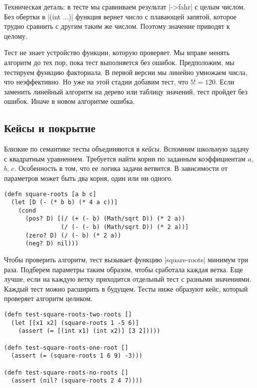 Техническая деталь: в тесте мы сравниваем результат \spverb|->fahr| с целым
числом. Без обертки в \spverb|(int ...)| функция вернет число с плавающей
запятой, которое трудно сравнить с другим таким же числом. Поэтому значение
приводят к целому.

Тест не знает устройство функции, которую проверяет. Мы вправе менять алгоритм
до тех пор, пока тест выполняется без ошибок. Предположим, мы тестируем функцию
факториала. В первой версии мы линейно умножаем числа, что неэффективно. Но уже
на этой стадии добавим тест, что $5! = 120$. Если заменить линейный алгоритм на
дерево или таблицу значений, тест пройдет без ошибок. Иначе в новом алгоритме
ошибка.

\subsection{Кейсы и покрытие}

Близкие по семантике тесты объединяются в \emph{кейсы}. Вспомним школьную задачу
с квадратным уравнением. Требуется найти корни по заданным коэффициентам $a$,
$b$, $c$. Особенность в том, что ее логика задачи ветвится. В зависимости от
параметров может быть два корня, один или ни одного.

\begin{verbatim}
(defn square-roots [a b c]
  (let [D (- (* b b) (* 4 a c))]
    (cond
      (pos? D) [(/ (+ (- b) (Math/sqrt D)) (* 2 a))
                (/ (- (- b) (Math/sqrt D)) (* 2 a))]
      (zero? D) (/ (- b) (* 2 a))
      (neg? D) nil)))
\end{verbatim}

Чтобы проверить алгоритм, тест вызывает функцию \spverb|square-roots| минимум
три раза. Подберем параметры таким образом, чтобы сработала каждая ветка. Еще
лучше, если на каждую ветку приходится отдельный тест с разными
значениями. Каждый тест можно расширить в будущем. Тесты ниже образуют кейс,
который проверяет алгоритм целиком.


\begin{verbatim}
(defn test-square-roots-two-roots []
  (let [[x1 x2] (square-roots 1 -5 6)]
    (assert (= [(int x1) (int x2)] [3 2]))))

(defn test-square-roots-one-root []
  (assert (= (square-roots 1 6 9) -3)))

(defn test-square-roots-no-roots []
  (assert (nil? (square-roots 2 4 7))))
\end{verbatim}

